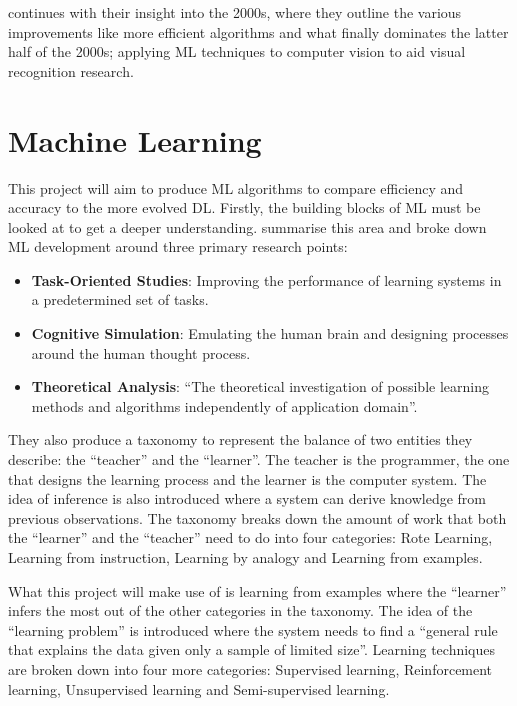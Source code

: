 \documentclass[12pt,a4paper]{report}
\begin{document}
\par

\citet{SzeliskiRichard2011CV:A} continues with their insight into the 2000s, where they outline the various 
improvements like more efficient algorithms and what finally dominates the latter half of the 2000s; applying ML 
techniques to computer vision to aid visual recognition research.

\section{Machine Learning}

This project will aim to produce ML algorithms to compare efficiency and accuracy to the more evolved DL. 
Firstly, the building blocks of ML must be looked at to get a deeper understanding. 
\citet{CamastraFrancescoMLfA} summarise this area and broke down ML development around three primary research 
points:

\begin{itemize}
    \item \textbf{Task-Oriented Studies}: Improving the performance of learning systems in a predetermined set of tasks.
    \item \textbf{Cognitive Simulation}: Emulating the human brain and designing processes around the human thought process.
    \item \textbf{Theoretical Analysis}: “The theoretical investigation of possible learning methods and algorithms 
    independently of application domain”.
\end{itemize}

They also produce a taxonomy to represent the balance of two entities they describe: the “teacher” and the “learner”. 
The teacher is the programmer, the one that designs the learning process and the learner is the computer system. 
The idea of inference is also introduced where a system can derive knowledge from previous observations. The taxonomy 
breaks down the amount of work that both the “learner” and the “teacher” need to do into four categories: Rote Learning,
Learning from instruction, Learning by analogy and Learning from examples.

\par

What this project will make use of is learning from examples where the “learner” infers the most out of the other 
categories in the taxonomy. The idea of the “learning problem” is introduced where the system needs to find a “general 
rule that explains the data given only a sample of limited size”. Learning techniques are broken down into four more 
categories: Supervised learning, Reinforcement learning, Unsupervised learning and Semi-supervised learning.
\end{document}
